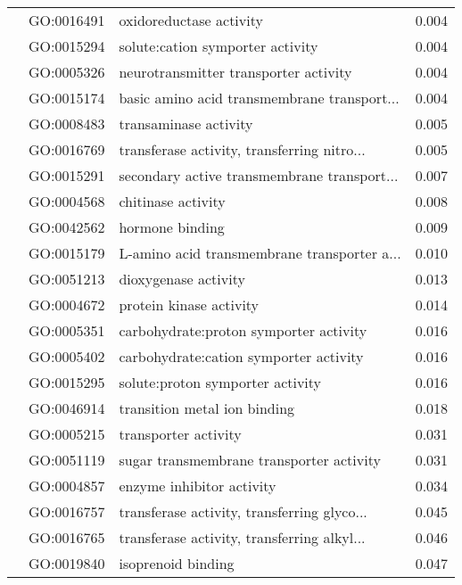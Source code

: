\begin{longtable}{lllr}
   & GO:0016491 &                      oxidoreductase activity &         0.004 \\
   & GO:0015294 &             solute:cation symporter activity &         0.004 \\
   & GO:0005326 &        neurotransmitter transporter activity &         0.004 \\
   & GO:0015174 &  basic amino acid transmembrane transport... &         0.004 \\
   & GO:0008483 &                        transaminase activity &         0.005 \\
   & GO:0016769 &  transferase activity, transferring nitro... &         0.005 \\
   & GO:0015291 &  secondary active transmembrane transport... &         0.007 \\
   & GO:0004568 &                           chitinase activity &         0.008 \\
   & GO:0042562 &                              hormone binding &         0.009 \\
   & GO:0015179 &  L-amino acid transmembrane transporter a... &         0.010 \\
   & GO:0051213 &                         dioxygenase activity &         0.013 \\
   & GO:0004672 &                      protein kinase activity &         0.014 \\
   & GO:0005351 &       carbohydrate:proton symporter activity &         0.016 \\
   & GO:0005402 &       carbohydrate:cation symporter activity &         0.016 \\
   & GO:0015295 &             solute:proton symporter activity &         0.016 \\
   & GO:0046914 &                 transition metal ion binding &         0.018 \\
   & GO:0005215 &                         transporter activity &         0.031 \\
   & GO:0051119 &     sugar transmembrane transporter activity &         0.031 \\
   & GO:0004857 &                    enzyme inhibitor activity &         0.034 \\
   & GO:0016757 &  transferase activity, transferring glyco... &         0.045 \\
   & GO:0016765 &  transferase activity, transferring alkyl... &         0.046 \\
   & GO:0019840 &                           isoprenoid binding &         0.047 \\

\end{longtable}
